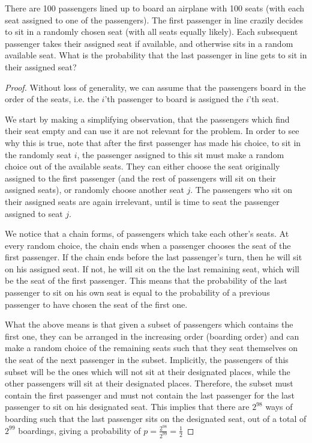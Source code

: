 \begin{exercise}{61}
There are 100 passengers lined up to board an airplane with 100 seats (with each seat assigned to one of the passengers). The first passenger in line crazily decides to sit in a randomly chosen seat (with all seats equally likely). Each subsequent passenger takes their assigned seat if available, and otherwise sits in a random available seat. What is the probability that the last passenger in line gets to sit in their assigned seat?
\end{exercise}

\begin{proof}
    Without loss of generality, we can assume that the passengers board in the order of the seats, i.e. the $i$'th passenger to board is assigned the $i$'th seat.
    
\vspace{1em}

    We start by making a simplifying observation, that the passengers which find their seat empty and can use it are not relevant for the problem. In order to see why this is true, note that after the first passenger has made his choice, to sit in the randomly seat $i$, the passenger assigned to this sit must make a random choice out of the available seats. They can either choose the seat originally assigned to the first passenger (and the rest of passengers will sit on their assigned seats), or randomly choose another seat $j$. The passengers who sit on their assigned seats are again irrelevant, until is time to seat the passenger assigned to seat $j$.
    
\vspace{1em}

    We notice that a chain forms, of passengers which take each other's seats. At every random choice, the chain ends when a passenger chooses the seat of the first passenger. If the chain ends before the last passenger's turn, then he will sit on his assigned seat. If not, he will sit on the the last remaining seat, which will be the seat of the first passenger. This means that the probability of the last passenger to sit on his own seat is equal to the probability of a previous passenger to have chosen the seat of the first one.
    
\vspace{1em}

    What the above means is that given a subset of passengers which contains the first one, they can be arranged in the increasing order (boarding order) and can make a random choice of the remaining seats such that they seat themselves on the seat of the next passenger in the subset. Implicitly, the passengers of this subset will be the ones which will not sit at their designated places, while the other passengers will sit at their designated places. Therefore, the subset must contain the first passenger and must not contain the last passenger for the last passenger to sit on his designated seat. This implies that there are $2^{98}$ ways of boarding such that the last passenger sits on the designated seat, out of a total of $2^{99}$ boardings, giving a probability of $p = \frac{2^{98}}{2^{99}} = \frac{1}{2}$
\end{proof}

\newpage

